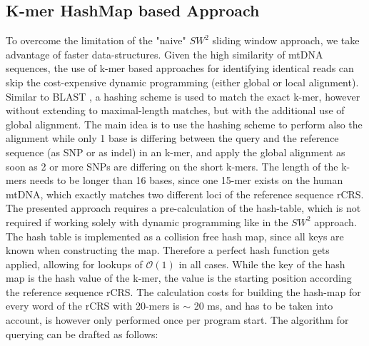 \subsection{K-mer HashMap based Approach}
To overcome the limitation of the "naive" $SW^{2}$ sliding window approach, we take advantage of faster data-structures. Given the high similarity of mtDNA sequences, the use of k-mer based approaches for identifying identical reads can skip the cost-expensive dynamic programming (either global or local alignment). Similar to BLAST \cite{Altschul1990}, a hashing scheme is used to match the exact k-mer, however without extending to maximal-length matches, but with the additional use of global alignment. The main idea is to use the hashing scheme to perform also the alignment while only 1 base is differing between the query and the reference sequence (as SNP or as indel) in an k-mer, and apply the global alignment as soon as 2 or more SNPs are differing on the short k-mers. The length of the k-mers needs to be longer than 16 bases, since one 15-mer exists on the human mtDNA, which exactly matches two different loci of the reference sequence rCRS.
The presented approach requires a pre-calculation of the hash-table, which is not required if working solely with dynamic programming like in the $SW^{2}$ approach.
The hash table is implemented as a collision free hash map, since all keys are known when constructing the map. Therefore a perfect hash function gets applied, allowing for lookups of $\mathcal{O}(1)$ in all cases. While the key of the hash map is the hash value of the k-mer, the value is the starting position according the reference sequence rCRS. The calculation costs for building the hash-map for every word of the rCRS with 20-mers is $\sim$ 20 ms, and has to be taken into account, is however only performed once per program start.
The algorithm for querying can be drafted as follows:
